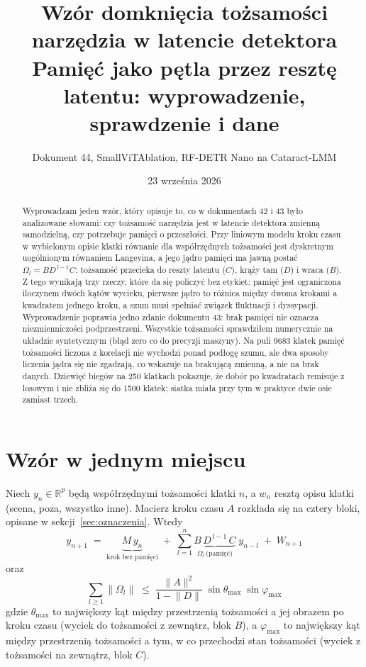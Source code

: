 \documentclass[11pt,a4paper]{article}
\title{Wzór domknięcia tożsamości narzędzia w latencie detektora\\[4pt]
\large Pamięć jako pętla przez resztę latentu: wyprowadzenie, sprawdzenie i dane}
\author{Dokument 44, SmallViTAblation, RF-DETR Nano na Cataract-LMM}
\date{23 września 2026}
\theoremstyle{definition}
\theoremstyle{remark}
\newcommand{\R}{\mathbb{R}}
\newcommand{\norm}[1]{\lVert #1\rVert}
\begin{document}
\maketitle

\begin{abstract}
\noindent
Wyprowadzam jeden wzór, który opisuje to, co w dokumentach 42 i 43 było analizowane słowami: czy
tożsamość narzędzia jest w latencie detektora zmienną samodzielną, czy potrzebuje pamięci o przeszłości.
Przy liniowym modelu kroku czasu w wybielonym opisie klatki równanie dla współrzędnych tożsamości jest
dyskretnym uogólnionym równaniem Langevina, a jego jądro pamięci ma jawną postać
$\Omega_l = B D^{\,l-1} C$: tożsamość przecieka do reszty latentu ($C$), krąży tam ($D$) i wraca ($B$).
Z tego wynikają trzy rzeczy, które da się policzyć bez etykiet: pamięć jest ograniczona iloczynem
dwóch kątów wycieku, pierwsze jądro to różnica między dwoma krokami a kwadratem jednego kroku, a szum
musi spełniać związek fluktuacji i dyssypacji. Wyprowadzenie poprawia jedno zdanie dokumentu 43:
brak pamięci nie oznacza niezmienniczości podprzestrzeni. Wszystkie tożsamości sprawdziłem numerycznie
na układzie syntetycznym (błąd zero co do precyzji maszyny). Na puli 9683 klatek pamięć tożsamości
liczona z korelacji nie wychodzi ponad podłogę szumu, ale dwa sposoby liczenia jądra się nie zgadzają,
co wskazuje na brakującą zmienną, a nie na brak danych. Dziewięć biegów na 250 klatkach pokazuje, że dobór po kwadratach
remisuje z losowym i nie zbliża się do 1500 klatek; siatka miała przy tym w praktyce dwie osie zamiast trzech.
\end{abstract}

\section{Wzór w jednym miejscu}

Niech $y_n\in\R^p$ będą współrzędnymi tożsamości klatki $n$, a $w_n$ resztą opisu klatki (scena, poza,
wszystko inne). Macierz kroku czasu $A$ rozkłada się na cztery bloki, opisane w sekcji~\ref{sec:oznaczenia}.
Wtedy
\begin{equation}\label{eq:glowny}
\boxed{\;
y_{n+1} \;=\; \underbrace{M\,y_n}_{\text{krok bez pamięci}}
\;+\; \sum_{l=1}^{n} \underbrace{B\,D^{\,l-1}\,C}_{\Omega_l\ \text{(pamięć)}}\; y_{n-l}
\;+\; W_{n+1}\;}
\end{equation}
oraz
\begin{equation}\label{eq:nierownosc}
\boxed{\;
\sum_{l\ge 1}\norm{\Omega_l} \;\le\; \frac{\norm{A}^2}{1-\norm{D}}\;\sin\theta_{\max}\;\sin\varphi_{\max}\;}
\end{equation}
gdzie $\theta_{\max}$ to największy kąt między przestrzenią tożsamości a jej obrazem po kroku czasu
(wyciek do tożsamości z zewnątrz, blok $B$), a $\varphi_{\max}$ to największy kąt między przestrzenią
tożsamości a tym, w co przechodzi stan tożsamości (wyciek z tożsamości na zewnątrz, blok $C$).
\end{document}
